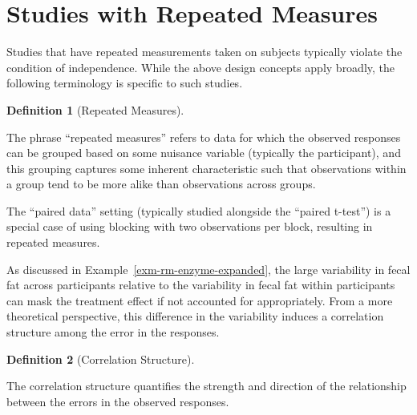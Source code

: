 \documentclass[
  letterpaper,
  DIV=11,
  numbers=noendperiod]{scrreprt}
\theoremstyle{definition}
\theoremstyle{definition}
\newtheorem{definition}{Definition}[chapter]
\theoremstyle{remark}
\begin{document}
\hypertarget{studies-with-repeated-measures}{%
\section{Studies with Repeated
Measures}\label{studies-with-repeated-measures}}

Studies that have repeated measurements taken on subjects typically
violate the condition of independence. While the above design concepts
apply broadly, the following terminology is specific to such studies.

\begin{definition}[Repeated
Measures]\protect\hypertarget{def-repeated-measures}{}\label{def-repeated-measures}

The phrase ``repeated measures'' refers to data for which the observed
responses can be grouped based on some nuisance variable (typically the
participant), and this grouping captures some inherent characteristic
such that observations within a group tend to be more alike than
observations across groups.

\end{definition}

\begin{tcolorbox}[enhanced jigsaw, bottomrule=.15mm, titlerule=0mm, bottomtitle=1mm, colback=white, coltitle=black, rightrule=.15mm, leftrule=.75mm, toprule=.15mm, toptitle=1mm, left=2mm, opacityback=0, colframe=quarto-callout-note-color-frame, breakable, title=\textcolor{quarto-callout-note-color}{\faInfo}\hspace{0.5em}{Note}, arc=.35mm, colbacktitle=quarto-callout-note-color!10!white, opacitybacktitle=0.6]

The ``paired data'' setting (typically studied alongside the ``paired
t-test'') is a special case of using blocking with two observations per
block, resulting in repeated measures.

\end{tcolorbox}

As discussed in Example~\ref{exm-rm-enzyme-expanded}, the large
variability in fecal fat across participants relative to the variability
in fecal fat within participants can mask the treatment effect if not
accounted for appropriately. From a more theoretical perspective, this
difference in the variability induces a correlation structure among the
error in the responses.

\begin{definition}[Correlation
Structure]\protect\hypertarget{def-correlation-structure}{}\label{def-correlation-structure}

The correlation structure quantifies the strength and direction of the
relationship between the errors in the observed responses.

\end{definition}
\end{document}
